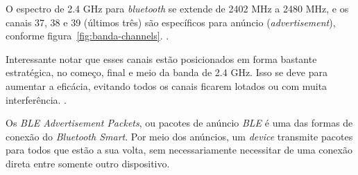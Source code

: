 \documentclass[
	12pt,				%
	openright,			%
	oneside,			%
	a4paper,			%
	chapter=TITLE,		%
	english,			%
	brazil				%
	]{abntex2}
\begin{document}
{\begin{table}[htb]
\end{table}

O espectro de 2.4 GHz para \textit{bluetooth} se extende de 2402 MHz a 2480 MHz, e os canais 37, 38 e 39 (últimos três) são específicos para anúncio (\textit{advertisement}), conforme figura~\ref{fig:banda-channels}.  \cite{ble-packets}. 

\begin{figure}[htb]
\end{figure}

Interessante notar que esses canais estão posicionados em forma bastante estratégica, no começo, final e meio da banda de 2.4 GHz. Isso se deve para aumentar a eficácia, evitando todos os canais ficarem lotados ou com muita interferência. \cite{ble-packets}. 

Os \textit{BLE Advertisement Packets}, ou pacotes de anúncio \textit{BLE} é uma das formas de conexão do \textit{Bluetooth Smart}. Por meio dos anúncios, um \textit{device} transmite pacotes para todos que estão a sua volta, sem necessariamente necessitar de uma conexão direta entre somente outro dispositivo.

}
\end{document}
